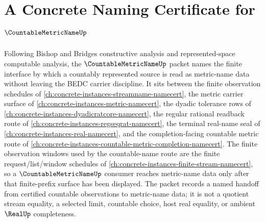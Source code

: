 \chapter{A Concrete Naming Certificate for $\CountableMetricNameUp$}
\label{ch:concrete-instances-countable-metric-name-namecert}

Following Bishop and Bridges constructive analysis and represented-space computable analysis, the $\CountableMetricNameUp$ packet names the finite interface by which a countably represented source is read as metric-name data without leaving the BEDC carrier discipline. It sits between the finite observation schedules of \autoref{ch:concrete-instances-streamname-namecert}, the metric carrier surface of \autoref{ch:concrete-instances-metric-namecert}, the dyadic tolerance rows of \autoref{ch:concrete-instances-dyadicratcore-namecert}, the regular rational readback route of \autoref{ch:concrete-instances-regseqrat-namecert}, the terminal real-name seal of \autoref{ch:concrete-instances-real-namecert}, and the completion-facing countable metric route of \autoref{ch:concrete-instances-countable-metric-completion-namecert}. The finite observation windows used by the countable-name route are the finite request/list/window schedules of \autoref{ch:concrete-instances-finite-stream-namecert}, so a $\CountableMetricNameUp$ consumer reaches metric-name data only after that finite-prefix surface has been displayed. The packet records a named handoff from certified countable observations to metric-name data; it is not a quotient stream equality, a selected limit, countable choice, host real equality, or ambient $\RealUp$ completeness.

